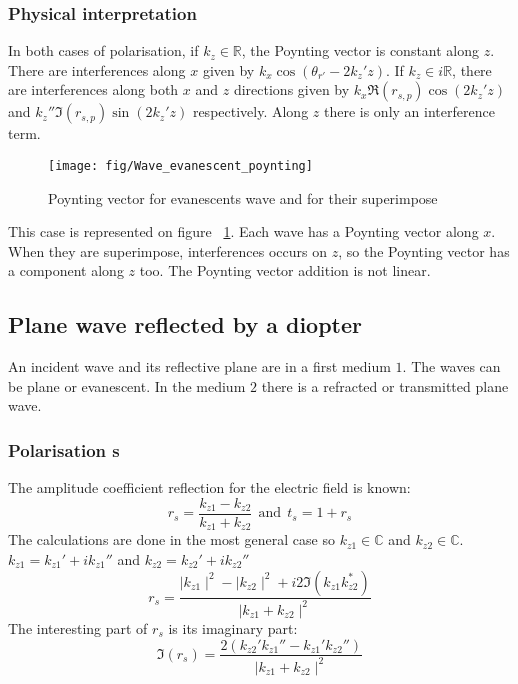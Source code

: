 \subsubsection{Physical interpretation}
In both cases of polarisation, if $k_z\in \mathbb{R}$, the Poynting vector is constant along $z$. There are interferences along $x$ given by $k_x\cos(\theta _{r'}-2k_z'z)$.
If $k_z\in i\mathbb{R}$, there are interferences along both $x$ and $z$ directions given by $k_x\Re(r_{s,p})\cos(2k_z'z)$ and $k_z''\Im(r_{s,p})\sin(2k_z'z)$ respectively. Along $z$ there is only an interference term.
\begin{figure}[!h]
\texttt{[image: fig/Wave\_evanescent\_poynting]}
\caption{\label{fig:Wave_evanescent_poynting}Poynting vector for evanescents wave 
 and for their superimpose}
\end{figure}
This case is represented on figure ~\ref{fig:Wave_evanescent_poynting}. Each wave has a Poynting vector along $x$. When they are superimpose, interferences occurs on $z$, so the Poynting vector has a component along $z$ too. The Poynting vector addition is not linear.

\subsection{Plane wave reflected by a diopter}
An incident wave and its reflective plane are in a first medium $1$. The waves can be plane or evanescent. In the medium $2$ there is a refracted or transmitted plane wave.  
\subsubsection{Polarisation s}
The amplitude coefficient reflection for the electric field is known:
$$r_s = \frac{k_{z1}-k_{z2}}{k_{z1}+k_{z2}} \ \ \text{and} \ \ t_s=1+r_s$$
The calculations are done in the most general case so $k_{z1}\in \mathbb{C}$ and $k_{z2}\in \mathbb{C}$.\\
$k_{z1}=k_{z1}'+ik_{z1}''$ and $k_{z2}=k_{z2}'+ik_{z2}''$
\begin{equation*}
r_s=\frac{\mid k_{z1}\mid ^2-\mid k_{z2}\mid ^2+i2\Im(k_{z1}k_{z2}^*)}{\mid k_{z1}+k_{z2}\mid^2}
\end{equation*}
The interesting part of $r_s$ is its imaginary part:\\
\begin{equation*}
\Im(r_s) = \frac{2(k_{z2}'k_{z1}''-k_{z1}'k_{z2}'')}{\mid k_{z1}+k_{z2}\mid^2}
\end{equation*}
